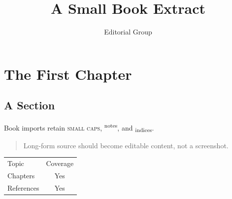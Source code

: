 \documentclass{book}
\title{A Small Book Extract}
\author{Editorial Group}
\begin{document}
\chapter{The First Chapter}\label{chap:first}
\section{A Section}
Book imports retain \textsc{small caps}, \textsuperscript{notes}, and
\textsubscript{indices}.

\begin{quotation}
Long-form source should become editable content, not a screenshot.
\end{quotation}

\begin{tabular}{lc}
  Topic & Coverage \\
  Chapters & Yes \\
  References & Yes
\end{tabular}
\end{document}
